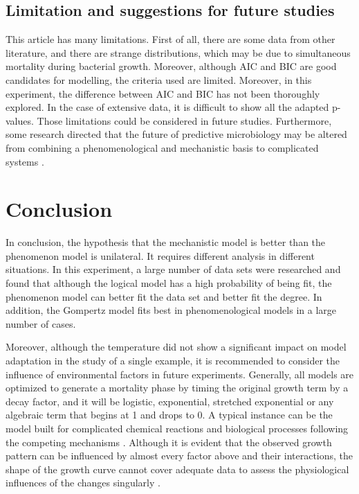 \documentclass[11pt]{article}
\begin{document}
\subsection{Limitation and suggestions for future studies}
This article has many limitations. First of all, there are some data from other literature, and there are strange distributions, which may be due to simultaneous mortality during bacterial growth. Moreover, although AIC and BIC are good candidates for modelling, the criteria used are limited. Moreover, in this experiment, the difference between AIC and BIC has not been thoroughly explored. In the case of extensive data, it is difficult to show all the adapted p-values. Those limitations could be considered in future studies. Furthermore, some research directed that the future of predictive microbiology may be altered from combining a phenomenological and mechanistic basis to complicated systems \citep{R5}. 


\section{Conclusion}
In conclusion, the hypothesis that the mechanistic model is better than the phenomenon model is unilateral. It requires different analysis in different situations. In this experiment, a large number of data sets were researched and found that although the logical model has a high probability of being fit, the phenomenon model can better fit the data set and better fit the degree. In addition, the Gompertz model fits best in phenomenological models in a large number of cases. 

Moreover, although the temperature did not show a significant impact on model adaptation in the study of a single example, it is recommended to consider the influence of environmental factors in future experiments. Generally, all models are optimized to generate a mortality phase by timing the original growth term by a decay factor, and it will be logistic, exponential, stretched exponential or any algebraic term that begins at 1 and drops to 0. A typical instance can be the model built for complicated chemical reactions and biological processes following the competing mechanisms \citep{R30}. Although it is evident that the observed growth pattern can be influenced by almost every factor above and their interactions, the shape of the growth curve cannot cover adequate data to assess the physiological influences of the changes singularly \citep{R29}.




\end{document}
